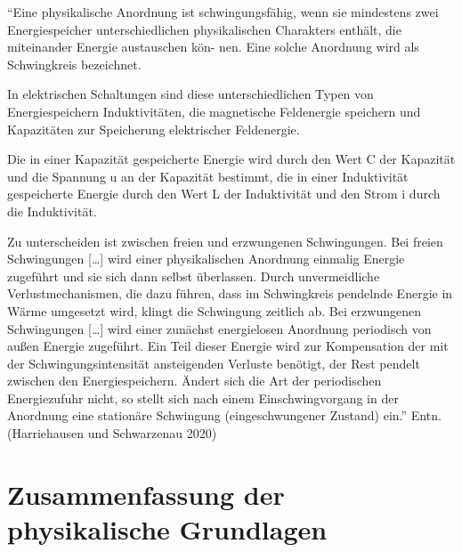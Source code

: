 \documentclass[
  ngerman,
  letterpaper,
]{scrbook}
\begin{document}
\begin{tcolorbox}[enhanced jigsaw, titlerule=0mm, rightrule=.15mm, toprule=.15mm, colback=white, toptitle=1mm, bottomrule=.15mm, coltitle=black, leftrule=.75mm, arc=.35mm, colbacktitle=quarto-callout-note-color!10!white, opacityback=0, bottomtitle=1mm, colframe=quarto-callout-note-color-frame, opacitybacktitle=0.6, breakable, title=\textcolor{quarto-callout-note-color}{\faInfo}\hspace{0.5em}{Schwingkreise (elek.)}, left=2mm]

``Eine physikalische Anordnung ist schwingungsfähig, wenn sie mindestens
zwei Energiespeicher unterschiedlichen physikalischen Charakters
enthält, die miteinander Energie austauschen kön- nen. Eine solche
Anordnung wird als Schwingkreis bezeichnet.

In elektrischen Schaltungen sind diese unterschiedlichen Typen von
Energiespeichern Induktivitäten, die magnetische Feldenergie speichern
und Kapazitäten zur Speicherung elektrischer Feldenergie.

Die in einer Kapazität gespeicherte Energie wird durch den Wert C der
Kapazität und die Spannung u an der Kapazität bestimmt, die in einer
Induktivität gespeicherte Energie durch den Wert L der Induktivität und
den Strom i durch die Induktivität.

Zu unterscheiden ist zwischen freien und erzwungenen Schwingungen. Bei
freien Schwingungen {[}\ldots{]} wird einer physikalischen Anordnung
einmalig Energie zugeführt und sie sich dann selbst überlassen. Durch
unvermeidliche Verlustmechanismen, die dazu führen, dass im Schwingkreis
pendelnde Energie in Wärme umgesetzt wird, klingt die Schwingung
zeitlich ab. Bei erzwungenen Schwingungen {[}\ldots{]} wird einer
zunächst energielosen Anordnung periodisch von außen Energie zugeführt.
Ein Teil dieser Energie wird zur Kompensation der mit der
Schwingungsintensität ansteigenden Verluste benötigt, der Rest pendelt
zwischen den Energiespeichern. Ändert sich die Art der periodischen
Energiezufuhr nicht, so stellt sich nach einem Einschwingvorgang in der
Anordnung eine stationäre Schwingung (eingeschwungener Zustand) ein.''
Entn. (Harriehausen und Schwarzenau 2020)

\end{tcolorbox}

\section{Zusammenfassung der physikalische
Grundlagen}\label{zusammenfassung-der-physikalische-grundlagen}
\end{document}
